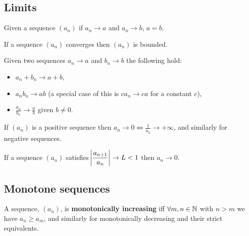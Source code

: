 \documentclass{article}
\begin{document}
\subsection{Limits}

\begin{theorem}
    Given a sequence $(a_n)$ if $a_n\rightarrow a$ and $a_n\rightarrow b$, $a=b$.
\end{theorem}

\begin{theorem}
    If a sequence $(a_n)$ converges then $(a_n)$ is bounded.
\end{theorem}

\begin{theorem}
    Given two sequences $a_n\rightarrow a$ and $b_n\rightarrow b$ the following hold: \begin{itemize}
        \item $a_n + b_n \rightarrow a + b$,
        \item $a_nb_n \rightarrow ab$ (a special case of this is $ca_n\rightarrow ca$ for a constant $c$),
        \item $\displaystyle{\frac{a_n}{b_n} \rightarrow \frac{a}{b}}$ given $b\neq0$.
    \end{itemize}
\end{theorem}

\vspace{-15pt}

\begin{theorem}
    If $(a_n)$ is a positive sequence then $a_n\rightarrow0\iff\displaystyle{\frac{1}{a_n}\rightarrow+\infty}$, and similarly for negative sequences.
\end{theorem}

\begin{theorem}
    If a sequence $(a_n)$ satisfies $\displaystyle \abs{\frac{a_{n+1}}{a_n}}\rightarrow L <1$ then $a_n\rightarrow0$.
\end{theorem}

\subsection{Monotone sequences}

\begin{definition}
    A sequence, $(a_n)$, is \textbf{monotonically increasing} iff $\forall m,n\in\mathbb{N}$ with $n>m$ we have $a_n\geq a_m$, and similarly for monotonically decreasing and their strict equivalents.
\end{definition}
\end{document}
